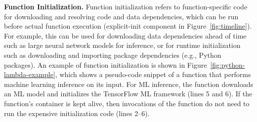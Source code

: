 \noindent \textbf{Function Initialization.}
%
Function initialization refers to function-specific code for downloading and resolving code and data dependencies, which can be run before actual function execution (explicit-init component in Figure~\ref{fig:timeline}). 
For example, this can be used for downloading data dependencies ahead of time such as large neural network models for inference, or for runtime initialization such as downloading and importing package dependencies (e.g., Python packages). 
%
An example of function initialization is shown in Figure~\ref{fig:python-lambda-example}, which shows a pseudo-code snippet of a function that performs machine learning inference on its input. 
For ML inference, the function downloads an ML model and initializes the TensorFlow ML framework (lines  5 and 6). 
If the function's container is kept alive, then invocations of the function do not need to run the expensive initialization code (lines 2--6). 

